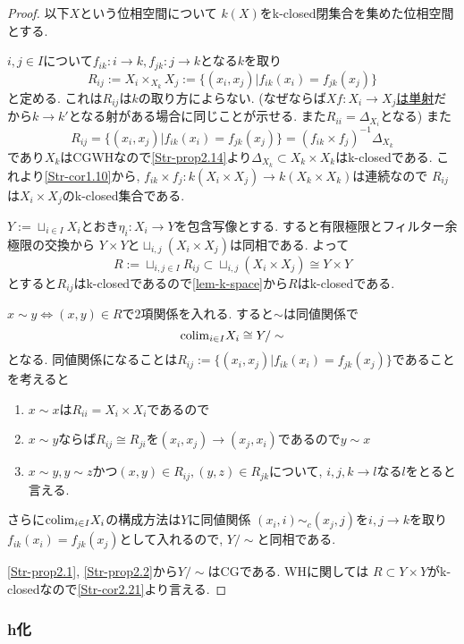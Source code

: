 \documentclass[dvipdfmx,a4paper,11pt]{article}
\newcommand{\colim}{{\rm colim}}
\theoremstyle{definition}
\begin{document}
\begin{proof}
以下$X$という位相空間について
$k(X)$をk-closed閉集合を集めた位相空間とする. 


$i,j \in I$について$f_{ik}:i \to k, f_{jk}: j \to k$となる$k$を取り
$$
R_{ij}:= X_{i} \times_{X_{k}} X_{j} := \{ (x_i, x_j) | f_{ik}(x_i) = f_{jk}(x_j)\}
$$
と定める. 
これは$R_{ij}$は$k$の取り方によらない. 
(なぜならば\underline{$Xf : X_i \to X_j$は単射}だから$k \to k'$となる射がある場合に同じことが示せる. また$R_{ii}= \Delta_{X_i}$となる)
また
$$
R_{ij}=\{ (x_i, x_j) | f_{ik}(x_i) = f_{jk}(x_j)\} = (f_{ik} \times f_{j})^{-1}\Delta_{X_k}
$$
であり$X_k$はCGWHなので\ref{Str-prop2.14}より$\Delta_{X_{k}} \subset X_k \times X_k$はk-closedである.
これより\ref{Str-cor1.10}から, $f_{ik} \times f_{j} : k(X_i \times X_j) \to k(X_k \times X_k)$は連続なので
$R_{ij}$は$X_i \times X_j$のk-closed集合である. 

$Y :=\sqcup_{i \in I}X_{i}$とおき$\eta_i : X_i \to Y$を包含写像とする. 
すると有限極限とフィルター余極限の交換から
$Y \times Y $と$ \sqcup_{i,j} (X_i \times X_j) $は同相である. 
よって
$$
R := \sqcup_{i,j \in I}R_{ij} \subset \sqcup_{i,j} (X_i \times X_j) \cong Y \times Y
$$
とすると$R_{ij}$はk-closedであるので\ref{lem-k-space}から$R$はk-closedである. 

$x \sim y \Leftrightarrow (x,y) \in R$で2項関係を入れる.
すると$\sim$は同値関係で
$$
\colim_{i \in I}X_i  \cong Y/\sim
$$ 
となる.
同値関係になることは$R_{ij}:= \{ (x_i, x_j) | f_{ik}(x_i) = f_{jk}(x_j)\}$であることを考えると
\begin{enumerate}
\item  $x \sim x$は$R_{ii}=X_{i} \times X_{i}$であるので
\item $x \sim y$ならば$R_{ij} \cong R_{ji}$を$(x_i, x_j) \to (x_j, x_i)$であるので$y \sim x$
\item $x \sim y, y \sim z$かつ$(x,y) \in R_{ij}, (y,z) \in R_{jk}$について, $i,j,k \to l$なる$l$をとると言える. 
\end{enumerate}
さらに$\colim_{i \in I}X_i  $の構成方法は$Y$に同値関係
$(x_i, i)\sim_{c} (x_j, j)$を$i,j \to k$を取り$f_{ik}(x_i) = f_{jk}(x_j)$として入れるので, $Y/\sim$と同相である.

\ref{Str-prop2.1}, \ref{Str-prop2.2}から$Y/\sim$はCGである.
WHに関しては
$R \subset Y \times Y$がk-closedなので\ref{Str-cor2.21}より言える.

\end{proof}

\subsubsection{h化}
\end{document}
